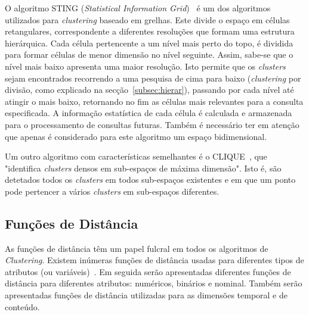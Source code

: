 O algoritmo STING (\textit{Statistical Information Grid})~\citet{Wang1997} é um dos algoritmos utilizados para \textit{clustering} baseado em grelhas. Este divide o espaço em células retangulares, correspondente a diferentes resoluções que formam uma estrutura hierárquica. Cada célula pertencente a um nível mais perto do topo, é dividida para formar células de menor dimensão no nível seguinte. Assim, sabe-se que o nível mais baixo apresenta uma maior resolução. Isto permite que os \textit{clusters} sejam encontrados recorrendo a uma pesquisa de cima para baixo (\textit{clustering} por divisão, como explicado na secção~\ref{subsec:hierar}), passando por cada nível até atingir o mais baixo, retornando no fim as células mais relevantes para a consulta especificada. A informação estatística de cada célula é calculada e armazenada para o processamento de consultas futuras. Também é necessário ter em atenção que apenas é considerado para este algoritmo um espaço bidimensional. 

Um outro algoritmo com características semelhantes é o CLIQUE~\citet{Agrawal1998}, que "identifica \textit{clusters} densos em sub-espaços de máxima dimensão". Isto é, são detetados todos os \textit{clusters} em todos sub-espaços existentes e em que um ponto pode pertencer a vários \textit{clusters} em sub-espaços diferentes.


%

\subsection{Funções de Distância} \label{subsec:dist}

As funções de distância têm um papel fulcral em todos os algoritmos de \textit{Clustering}. Existem inúmeras funções de distância usadas para diferentes tipos de atributos (ou variáveis)~\citet{Liu2011}. Em seguida serão apresentadas diferentes funções de distância para diferentes atributos: numéricos, binários e nominal. Também serão apresentadas funções de distância utilizadas para as dimensões temporal e de conteúdo. 

